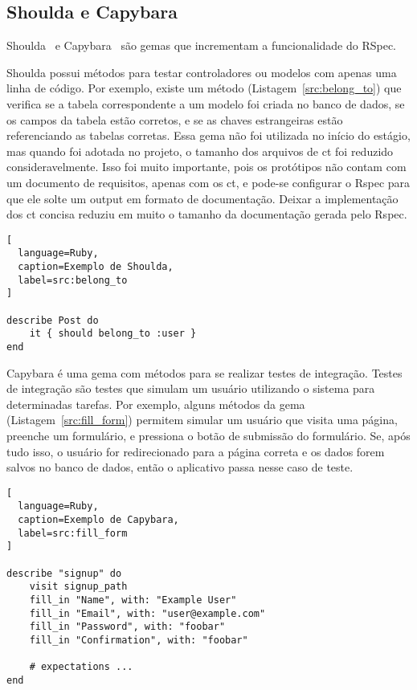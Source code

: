 \subsection{Shoulda e Capybara}

Shoulda~\cite{Shoulda} e Capybara~\cite{Capybara} são gemas que incrementam a funcionalidade do RSpec.

Shoulda possui métodos para testar controladores ou modelos com apenas uma linha de código. Por exemplo, existe um método (Listagem~\ref{src:belong_to})
que verifica se a tabela correspondente
a um modelo foi criada no banco de dados, se os campos da tabela estão corretos, e se as chaves estrangeiras estão referenciando as tabelas corretas. Essa gema
não foi utilizada no início do estágio, mas quando foi adotada no projeto, o tamanho dos arquivos de \gls{ct} foi reduzido consideravelmente. Isso foi muito
importante, pois os protótipos não contam com um documento de requisitos, apenas com os \gls{ct}, e pode-se configurar o Rspec para que ele solte um
output em formato de documentação. Deixar a implementação dos \gls{ct} concisa reduziu em muito o tamanho da documentação gerada pelo Rspec.

\begin{lstlisting}[
  language=Ruby,
  caption=Exemplo de Shoulda,
  label=src:belong_to
]

describe Post do
	it { should belong_to :user }
end

\end{lstlisting}

Capybara é uma gema com métodos para se realizar testes de integração. Testes de integração são testes que simulam um usuário utilizando o sistema para
determinadas tarefas. Por exemplo, alguns métodos da gema (Listagem~\ref{src:fill_form}) permitem simular um usuário que visita uma página,
preenche um formulário, e pressiona o botão de submissão do formulário. Se, após tudo isso, o usuário for redirecionado para a página correta e os dados
forem salvos no banco de dados, então o aplicativo passa nesse caso de teste.

\begin{lstlisting}[
  language=Ruby,
  caption=Exemplo de Capybara,
  label=src:fill_form
]

describe "signup" do
	visit signup_path
	fill_in "Name", with: "Example User"
	fill_in "Email", with: "user@example.com"
	fill_in "Password", with: "foobar"
	fill_in "Confirmation", with: "foobar"
	
	# expectations ...
end

\end{lstlisting}

